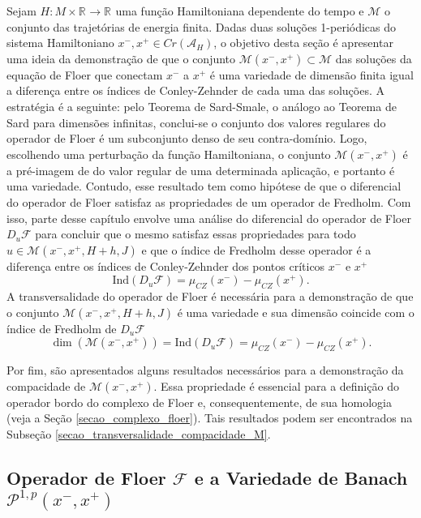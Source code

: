 \documentclass[12pt]{book}
\newcommand{\caminhosexponenciaisconectantes}[2]{\mathcal{P}^{1,p}(#1, #2)}
\newcommand{\caminhosexponenciaisconectantespadrao}{\caminhosexponenciaisconectantes{x^{-}}{x^{+}}}
\newcommand{\diferencialfloerponto}[1]{D_{#1}\operadorFloer}
\newcommand{\energiafinitaM}{\mathcal{M}}
\newcommand{\energiafinitaMconectante}{\energiafinitaM(x^{-}, x^{+})}
\newcommand{\energiafinitaMconectanteHamiltoniana}{\energiafinitaM(x^{-}, x^{+},H+h,J)}
\newcommand{\funcionalH}{\mathcal{A}_{H}}
\newcommand{\iconley}[1]{\iconleyabrev(#1)}
\newcommand{\iconleyabrev}{\mu_{CZ}}
\newcommand{\ind}{\text{Ind}}
\newcommand{\operadorFloer}{\mathcal{F}}
\newcommand{\pontoscriticos}[1]{\textit{Cr}(#1)}
\newcommand{\real}[1]{\mathbb{R}^{#1}}
\newcommand{\reta}{\real{}}
\begin{document}
	Sejam $H:M\times \reta\to \reta$ uma função Hamiltoniana dependente do tempo e $\energiafinitaM$ o conjunto das trajetórias de energia finita. Dadas duas soluções 1-periódicas do sistema Hamiltoniano $x^{-}, x^{+} \in \pontoscriticos{\funcionalH}$, o objetivo desta seção é apresentar uma ideia da demonstração de que o conjunto $\energiafinitaMconectante \subset \energiafinitaM$ das soluções da equação de Floer que conectam $x^{-}$ a $x^{+}$ é uma variedade de dimensão finita igual a diferença entre os índices de Conley-Zehnder de cada uma das soluções. A estratégia é a seguinte: pelo Teorema de Sard-Smale, o análogo ao Teorema de Sard para dimensões infinitas, conclui-se o conjunto dos valores regulares do operador de Floer é um subconjunto denso de seu contra-domínio. Logo, escolhendo uma perturbação da função Hamiltoniana, o conjunto $\energiafinitaMconectante$ é a pré-imagem de do valor regular de uma determinada aplicação, e portanto é uma variedade. Contudo, esse resultado tem como hipótese de que o diferencial do operador de Floer satisfaz as propriedades de um operador de Fredholm. Com isso, parte desse capítulo envolve uma análise do diferencial do operador de Floer $\diferencialfloerponto{u}$ para concluir que o mesmo satisfaz essas propriedades para todo $u\in \energiafinitaMconectanteHamiltoniana$ e que o índice de Fredholm desse operador é a diferença entre os índices de Conley-Zehnder dos pontos críticos $x^{-}$ e $x^{+}$
	$$
	\ind(\diferencialfloerponto{u})=\iconley{x^{-}}-\iconley{x^{+}}.
	$$
	A transversalidade do operador de Floer é necessária para a demonstração de que o conjunto  $\energiafinitaMconectanteHamiltoniana$ é uma variedade e sua dimensão coincide com o índice de Fredholm de $\diferencialfloerponto{u}$
	$$
	\dim(\energiafinitaMconectante)= \ind(\diferencialfloerponto{u}) = \iconley{x^{-}}-\iconley{x^{+}}.
	$$
	
	Por fim, são apresentados alguns resultados necessários para a demonstração da compacidade de $\energiafinitaMconectante$. Essa propriedade é essencial para a definição do operador bordo do complexo de Floer e, consequentemente, de sua homologia (veja a Seção \ref{secao_complexo_floer}). Tais resultados podem ser encontrados na Subseção \ref{secao_transversalidade_compacidade_M}.
	
	\subsection{Operador de Floer $\operadorFloer$ e a Variedade de Banach $\caminhosexponenciaisconectantespadrao$}\label{secao_variedade_banach_P}
	
\end{document}
